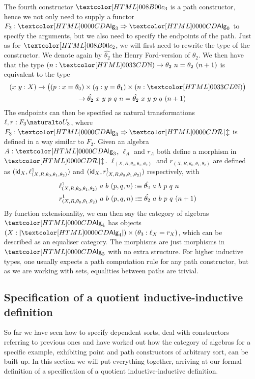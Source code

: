 The fourth constructor $\Bciii$ is a path constructor, hence we not
only need to supply a functor $F_3 : \Func{\Alg_3}{\Alg_0}$ to specify
the arguments, but we also need to specify the endpoints of the
path. Just as for $\Bcii$, we will first need to rewrite the type of
the constructor. We denote again by $\hat{\theta_2}$ the Henry
Ford-version of $\theta_2$.  We then have that the type
$(n : \natty) \to \theta_2\ n = \theta_2\ (n+ 1)$ is equivalent to the
type
%
\begin{multline*}
(x\ y : X) \to \big((p : x =  \theta_0) \times (q : y = \theta_1) \times (n : \natty)\big) \\
\ \ \ \ \to \hat{\theta_2}\ x\ y\ p\ q\ n = \hat{\theta_2}\ x\ y\ p\ q\ (n+1)
\end{multline*}
%
The endpoints can then be specified as natural transformations
$\ell, r : \Nat{F_3}{U_3}$, where $F_3 : \Func{\Alg_3}{\REL}$ is defined in a
way similar to $F_2$. Given an algebra $A : \Alg_3$, $\ell_A$ and $r_A$
both define a morphism in
$\REL$. $\ell_{(X,R,\theta_0,\theta_1,\theta_2)}$ and
$r_{(X,R,\theta_0,\theta_1,\theta_2)}$ are defined as
$(\id_X, \ell^1_{(X,R,\theta_0,\theta_1,\theta_2)})$ and
$(\id_X,r^1_{(X,R,\theta_0,\theta_1,\theta_2)})$ respectively, with
%
\begin{align*}
&\ell^1_{(X,R,\theta_0,\theta_1,\theta_2)}\ a\ b\ (p, q, n) :\equiv \hat{\theta_2}\ a\ b\ p\ q\ n \\
&r^1_{(X,R,\theta_0,\theta_1,\theta_2)}\ a\ b\ (p, q, n) :\equiv \hat{\theta_2}\ a\ b\ p\ q\ (n+1)
\end{align*}
%
By function extensionality, we can then say the category of algebras
$\Alg_4$ has objects
$(X : | \Alg_4 |) \times (\theta_3 : \ell_X = r_X)$, which can be
described as an equaliser category. The morphisms are just morphisms
in $\Alg_3$ with no extra structure. For higher inductive types, one
usually expects a path computation rule for any path constructor, but
as we are working with sets, equalities between paths are trivial.

\subsection{Specification of a quotient inductive-inductive definition}

So far we have seen how to specify dependent sorts, deal with
constructors referring to previous ones and have worked out how the
category of algebras for a specific example, exhibiting point and path
constructors of arbitrary sort, can be built up. In this section we
will put everything together, arriving at our formal definition of a
specification of a quotient inductive-inductive definition.


